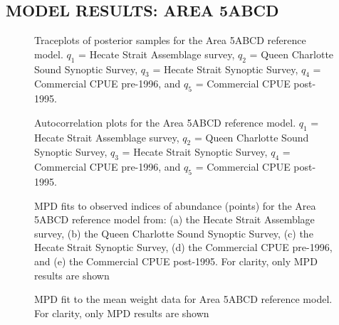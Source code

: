 \documentclass[11pt]{book}
\begin{document}
\hypertarget{model-results-area-5abcd}{%
\subsection{MODEL RESULTS: AREA 5ABCD}\label{model-results-area-5abcd}}
\begin{figure}[htb]

{\centering {} 

}

\caption{Traceplots of posterior samples for the Area 5ABCD reference model. $q_1$ = Hecate Strait Assemblage survey, $q_2$ = Queen Charlotte Sound Synoptic Survey, $q_3$ = Hecate Strait Synoptic Survey, $q_4$ = Commercial CPUE pre-1996, and $q_5$ = Commercial CPUE post-1995.}\label{fig:fig-base-mcmc-trace-5abcd}
\end{figure}
\begin{figure}[htb]

{\centering {} 

}

\caption{Autocorrelation plots for the Area 5ABCD reference model. $q_1$ = Hecate Strait Assemblage survey, $q_2$ = Queen Charlotte Sound Synoptic Survey, $q_3$ = Hecate Strait Synoptic Survey, $q_4$ = Commercial CPUE pre-1996, and $q_5$ = Commercial CPUE post-1995.}\label{fig:fig-base-mcmc-autocor-5abcd}
\end{figure}
\begin{figure}[htb]

{\centering {} 

}

\caption{MPD fits to observed indices of abundance (points) for the Area 5ABCD reference model from: (a) the Hecate Strait Assemblage survey, (b) the Queen Charlotte Sound Synoptic Survey, (c) the Hecate Strait Synoptic Survey, (d) the Commercial CPUE pre-1996, and (e) the Commercial CPUE post-1995. For clarity, only MPD results are shown}\label{fig:fig-base-index-fits-5abcd}
\end{figure}
\begin{figure}[htb]

{\centering {} 

}

\caption{MPD fit to the mean weight data for Area 5ABCD reference model. For clarity, only MPD results are shown}\label{fig:fig-base-mean-weight-5abcd}
\end{figure}
\end{document}
